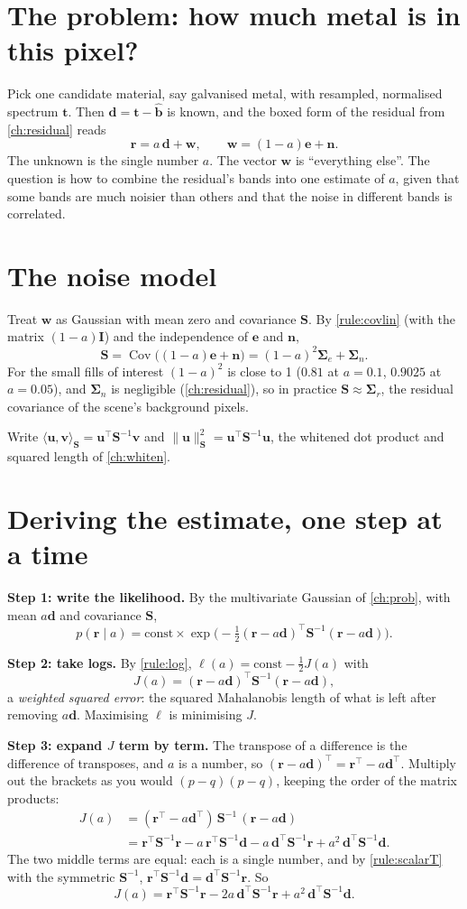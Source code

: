\documentclass[11pt,a4paper,oneside,openany]{book}
\newcommand{\B}[1]{{\symbf{#1}}}
\newcommand{\B}[1]{{\bm{#1}}}
\newcommand{\T}{^{\top}}
\newcommand{\Cov}{\operatorname{Cov}}
\newcommand{\nrm}[1]{\lVert #1\rVert}
\newcommand{\vt}{\B{t}}
\newcommand{\vbh}{\hat{\B{b}}}
\newcommand{\vr}{\B{r}}
\newcommand{\ve}{\B{e}}
\newcommand{\vn}{\B{n}}
\newcommand{\vd}{\B{d}}
\newcommand{\vu}{\B{u}}
\newcommand{\vv}{\B{v}}
\newcommand{\vw}{\B{w}}
\newcommand{\mS}{\B{S}}
\newcommand{\mI}{\B{I}}
\newcommand{\mSig}{\B{\Sigma}}
\begin{document}
\section{The problem: how much metal is in this pixel?}

Pick one candidate material, say galvanised metal, with resampled, normalised spectrum $\vt$. Then $\vd=\vt-\vbh$ is known, and the
boxed form of the residual from \cref{ch:residual} reads
\[
  \vr=a\,\vd+\vw,\qquad \vw=(1-a)\ve+\vn .
\]
The unknown is the single number $a$. The vector $\vw$ is ``everything else''. The question is how to combine the residual's bands into
one estimate of $a$, given that some bands are much noisier than others and that the noise in different bands is correlated.

\section{The noise model}

Treat $\vw$ as Gaussian with mean zero and covariance $\mS$. By \cref{rule:covlin} (with the matrix $(1-a)\mI$) and the independence of
$\ve$ and $\vn$,
\[
  \mS=\Cov\big((1-a)\ve+\vn\big)=(1-a)^2\mSig_e+\mSig_n .
\]
For the small fills of interest $(1-a)^2$ is close to 1 ($0.81$ at $a=0.1$, $0.9025$ at $a=0.05$), and $\mSig_n$ is negligible
(\cref{ch:residual}), so in practice $\mS\approx\mSig_r$, the residual covariance of the scene's background pixels.

Write $\langle\vu,\vv\rangle_{\mS}=\vu\T\mS^{-1}\vv$ and $\nrm{\vu}_{\mS}^2=\vu\T\mS^{-1}\vu$, the whitened dot product and squared length of
\cref{ch:whiten}.

\section{Deriving the estimate, one step at a time}

\textbf{Step 1: write the likelihood.} By the multivariate Gaussian of \cref{ch:prob}, with mean $a\vd$ and covariance $\mS$,
\[
  p(\vr\mid a)=\text{const}\times\exp\!\Big(-\tfrac12(\vr-a\vd)\T\mS^{-1}(\vr-a\vd)\Big).
\]

\textbf{Step 2: take logs.} By \cref{rule:log}, $\ell(a)=\text{const}-\frac12J(a)$ with
\[
  J(a)=(\vr-a\vd)\T\mS^{-1}(\vr-a\vd),
\]
a \emph{weighted squared error}: the squared Mahalanobis length of what is left after removing $a\vd$. Maximising $\ell$ is minimising $J$.

\textbf{Step 3: expand $J$ term by term.} The transpose of a difference is the difference of transposes, and $a$ is a number, so
$(\vr-a\vd)\T=\vr\T-a\vd\T$. Multiply out the brackets as you would $(p-q)(p-q)$, keeping the order of the matrix products:
\begin{align*}
J(a) &= (\vr\T-a\vd\T)\,\mS^{-1}\,(\vr-a\vd)\\
 &= \vr\T\mS^{-1}\vr-a\,\vr\T\mS^{-1}\vd-a\,\vd\T\mS^{-1}\vr+a^2\,\vd\T\mS^{-1}\vd .
\end{align*}
The two middle terms are equal: each is a single number, and by \cref{rule:scalarT} with the symmetric $\mS^{-1}$,
$\vr\T\mS^{-1}\vd=\vd\T\mS^{-1}\vr$. So
\[
  J(a)=\vr\T\mS^{-1}\vr-2a\,\vd\T\mS^{-1}\vr+a^2\,\vd\T\mS^{-1}\vd .
\]
\end{document}
